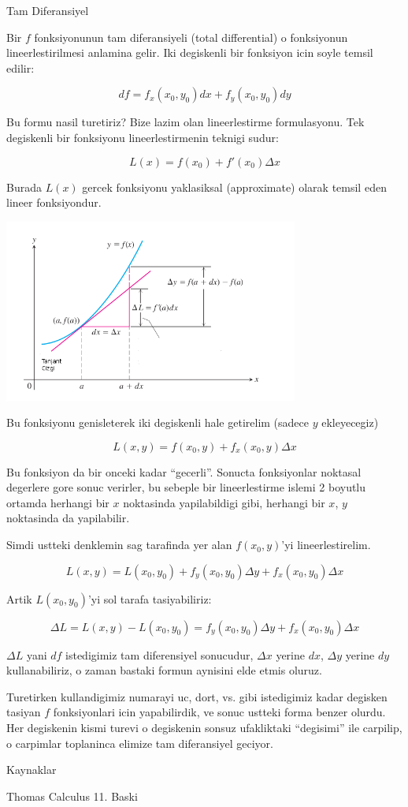 \documentclass[12pt,fleqn]{article}\usepackage{../common}
\begin{document}
Tam Diferansiyel

Bir $f$ fonksiyonunun tam diferansiyeli (total differential) o
fonksiyonun lineerlestirilmesi anlamina gelir. Iki degiskenli bir
fonksiyon icin soyle temsil edilir:

\[ df = f_x(x_0, y_0)dx + f_y(x_0,y_0)dy  \]

Bu formu nasil turetiriz? Bize lazim olan lineerlestirme formulasyonu. Tek
degiskenli bir fonksiyonu lineerlestirmenin teknigi sudur:

\[ L(x) = f(x_0) + f'(x_0) \Delta x  \]

Burada $L(x)$ gercek fonksiyonu yaklasiksal (approximate) olarak temsil eden
lineer fonksiyondur. 

\includegraphics[height=6cm]{linearization.png}

Bu fonksiyonu genisleterek iki degiskenli hale getirelim (sadece $y$
ekleyecegiz)

\[ L(x,y) = f(x_0,y) + f_x(x_0,y) \Delta x \]

Bu fonksiyon da bir onceki kadar ``gecerli''. Sonucta fonksiyonlar
noktasal degerlere gore sonuc verirler, bu sebeple bir lineerlestirme
islemi 2 boyutlu ortamda herhangi bir $x$ noktasinda yapilabildigi
gibi, herhangi bir $x$, $y$ noktasinda da yapilabilir.

Simdi ustteki denklemin sag tarafinda yer alan $f(x_0,y)$'yi lineerlestirelim.  

\[ L(x,y) = L(x_0,y_0) + f_y(x_0,y_0) \Delta y + f_x(x_0,y_0) \Delta x \]

Artik $L(x_0,y_0)$'yi sol tarafa tasiyabiliriz:

\[ \Delta L = L(x,y) - L(x_0,y_0) = f_y(x_0,y_0) \Delta y + f_x(x_0,y_0) \Delta x \]

$\Delta L$ yani $df$ istedigimiz tam diferensiyel sonucudur, $\Delta
x$ yerine $dx$, $\Delta y$ yerine $dy$ kullanabiliriz, o zaman bastaki
formun aynisini elde etmis oluruz.

Turetirken kullandigimiz numarayi uc, dort, vs. gibi istedigimiz kadar
degisken tasiyan $f$ fonksiyonlari icin yapabilirdik, ve sonuc ustteki
forma benzer olurdu. Her degiskenin kismi turevi o degiskenin sonsuz
ufakliktaki ``degisimi'' ile carpilip, o carpimlar toplaninca elimize
tam diferansiyel geciyor.

Kaynaklar

Thomas Calculus 11. Baski
\end{document}
